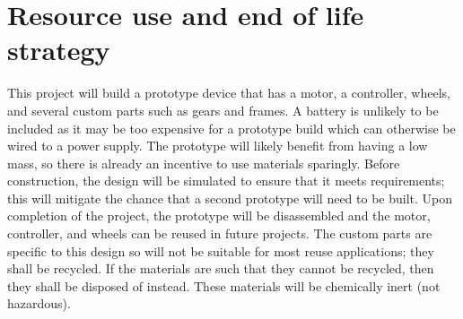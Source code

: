 \chapter{Resource use and end of life strategy}

This project will build a prototype device that has a motor, a controller, wheels, and several custom parts such as gears and frames. A battery is unlikely to be included as it may be too expensive for a prototype build which can otherwise be wired to a power supply.
The prototype will likely benefit from having a low mass, so there is already an incentive to use materials sparingly. Before construction, the design will be simulated to ensure that it meets requirements; this will mitigate the chance that a second prototype will need to be built. Upon completion of the project, the prototype will be disassembled and the motor, controller, and wheels can be reused in future projects. The custom parts are specific to this design so will not be suitable for most reuse applications; they shall be recycled. If the materials are such that they cannot be recycled, then they shall be disposed of instead. These materials will be chemically inert (not hazardous).
